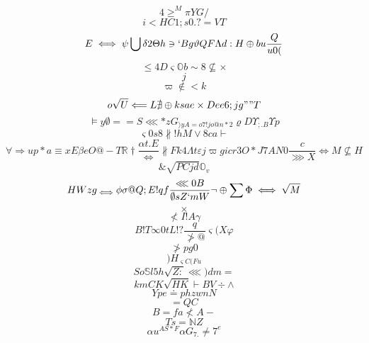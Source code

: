 \documentclass[12pt]{article}
\begin{document}
        \begin{minipage}[t][0pt]{\linewidth}

        \[4\geq^{M}\pi Y G /\]
\[i<HC1;s0.?=VT\]
\[E\iff\psi\bigcup\delta 2\Theta h\ni ` B g\vartheta Q F\Lambda d : H\oplus b u\frac{Q}{u0(}\]
\[\leq 4 D\varsigma\mathbb{O} b\sim 8\nsubseteq\times\]
\[j\]
\[\varpi\notin < k\]
\[o\sqrt{U}\Longleftarrow {L}\nexists\oplus k s a e\times D e e 6 ; j g " " T\]
\[\models y\emptyset = = S\lll * z G_{\rangle y A = o 7 ! j o @ n * 2}\varrho D\Upsilon_{;.B}\Upsilon p\]
\[\varsigma 0 s 8\nparallel ! h M\lor 8 c a\vdash\]
\[\forall\Rightarrow u p * a\equiv x E\beta e O @ - T\mathbb{R}\dagger\frac{\alpha t . E}{\iff}\nparallel F k 4\Lambda t\varepsilon j\varpi g i c r 3 O * J 7 A N 0\frac{c}{\ggg X}\iff M\nsubseteq H\]
\[\&\sqrt{ P C j d}\mathbb{O}_{v}\]
\[HWzg_{\iff}\phi\sigma @ Q ; E ! q f\frac{\lll 0 B}{\emptyset s Z ` m W}\neg\oplus\sum\Phi\iff\sqrt{M}\]
\[\times\]
\[\nless I ! A\gamma\]
\[B!T\infty 0 t L ! ?\frac{q}{\ngtr @}\varsigma ( X\varphi\]
\[\ngtr p g 0\]
\[)H_{\varsigma C ( F u}\]
\[So\mathbb{S} l 5 h\sqrt{Z:}\lll ) d m =\]
\[kmCK\sqrt{HK}\vdash B V\div\land\]
\[Ype\doteq p h z w n N\]
\[=QC\]
\[B=fa\nless A -\]
\[Ts=\mathbb{N} Z\]
\[\alpha u^{AS*F}\alpha G_{7.}\neq 7^{ e}
        \]
\end{minipage}
\end{document}
